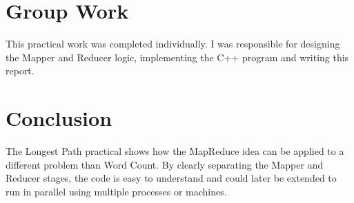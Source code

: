 \documentclass[a4paper,11pt]{article}
\begin{document}
\section{Group Work}
This practical work was completed individually. I was responsible for
designing the Mapper and Reducer logic, implementing the C++ program
and writing this report.

\section{Conclusion}
The Longest Path practical shows how the MapReduce idea can be applied
to a different problem than Word Count. By clearly separating the
Mapper and Reducer stages, the code is easy to understand and could
later be extended to run in parallel using multiple processes or
machines.
\end{document}

